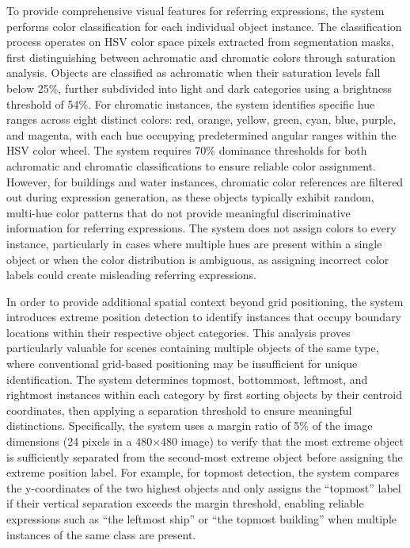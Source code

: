 To provide comprehensive visual features for referring expressions, the system performs color classification for each individual object instance. The classification process operates on HSV color space pixels extracted from segmentation masks, first distinguishing between achromatic and chromatic colors through saturation analysis. Objects are classified as achromatic when their saturation levels fall below 25\%, further subdivided into light and dark categories using a brightness threshold of 54\%. For chromatic instances, the system identifies specific hue ranges across eight distinct colors: red, orange, yellow, green, cyan, blue, purple, and magenta, with each hue occupying predetermined angular ranges within the HSV color wheel. The system requires 70\% dominance thresholds for both achromatic and chromatic classifications to ensure reliable color assignment. However, for buildings and water instances, chromatic color references are filtered out during expression generation, as these objects typically exhibit random, multi-hue color patterns that do not provide meaningful discriminative information for referring expressions. The system does not assign colors to every instance, particularly in cases where multiple hues are present within a single object or when the color distribution is ambiguous, as assigning incorrect color labels could create misleading referring expressions.

In order to provide additional spatial context beyond grid positioning, the system introduces extreme position detection to identify instances that occupy boundary locations within their respective object categories. This analysis proves particularly valuable for scenes containing multiple objects of the same type, where conventional grid-based positioning may be insufficient for unique identification. The system determines topmost, bottommost, leftmost, and rightmost instances within each category by first sorting objects by their centroid coordinates, then applying a separation threshold to ensure meaningful distinctions. Specifically, the system uses a margin ratio of 5\% of the image dimensions (24 pixels in a 480$\times$480 image) to verify that the most extreme object is sufficiently separated from the second-most extreme object before assigning the extreme position label. For example, for topmost detection, the system compares the y-coordinates of the two highest objects and only assigns the ``topmost'' label if their vertical separation exceeds the margin threshold, enabling reliable expressions such as ``the leftmost ship'' or ``the topmost building'' when multiple instances of the same class are present.

